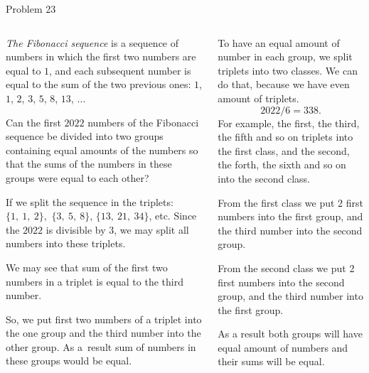 \documentclass[9pt,aspectratio=169]{beamer}
\begin{document}
\begin{frame}{Problem 23}
  \begin{columns}[T]
    \begin{column}{0.5\textwidth}
      \begin{problem}
        \emph{The Fibonacci sequence} is a sequence of numbers in which the first two numbers are equal to $1$, and each subsequent number is equal to the sum of the two previous ones: $1$, $1$, $2$, $3$, $5$, $8$, $13$, $\ldots$ 
        
        Can the first $2022$ numbers of the Fibonacci sequence be divided into two groups containing equal amounts of the numbers so that the sums of the numbers in these groups were equal to each other?
      \end{problem}
      If we split the sequence in the triplets:
      $\{1,\ 1,\ 2\},$ $\{3,\ 5,\ 8\}$, $\{13,\ 21,\ 34\}$, etc.
      Since the $2022$ is divisible by $3$, we may split all numbers into these triplets.

      We may see that sum of the first two numbers in a triplet is equal to the third number. 
      
      So, we put first two numbers of a triplet into the one group and the third number into the other group. As a~result sum of numbers in these groups would be equal. 
    \end{column}
    \begin{column}{0.5\textwidth}
      To have an equal amount of number in each group, we split triplets into two classes. We can do that, because we have even amount of triplets.
      \[ 2022 / 6 = 338. \]
      For example, the first, the third, the fifth and so on triplets into the first class, and the second, the forth, the sixth and so on into the second class.

      From the first class we put 2 first numbers into the first group, and the third number into the second group.

      From the second class we put 2 first numbers into the second group, and the third number into the first group.

      \medskip
      As a result both groups will have equal amount of numbers and their sums will be equal.
    \end{column}
  \end{columns}
\end{frame}
\end{document}
